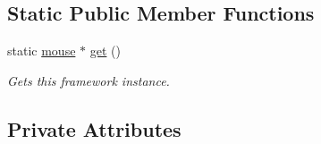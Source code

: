 \subsection*{Static Public Member Functions}
\begin{DoxyCompactItemize}
\item 
static \hyperlink{classflounder_1_1mouse}{mouse} $\ast$ \hyperlink{classflounder_1_1mouse_ac164dd73c45f0babcb67c9e24f50eff2}{get} ()
\begin{DoxyCompactList}\small\item\em Gets this framework instance. \end{DoxyCompactList}\end{DoxyCompactItemize}
\subsection*{Private Attributes}
